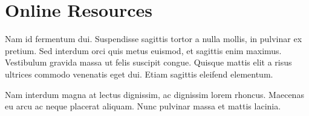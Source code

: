 \documentclass[sigconf]{acmart}
\begin{document}
\section{Online Resources}

Nam id fermentum dui. Suspendisse sagittis tortor a nulla mollis, in pulvinar ex pretium. Sed interdum orci quis metus euismod, et sagittis enim maximus. Vestibulum gravida massa ut felis suscipit congue. Quisque mattis elit a risus ultrices commodo venenatis eget dui. Etiam sagittis eleifend elementum. 

Nam interdum magna at lectus dignissim, ac dignissim lorem rhoncus. Maecenas eu arcu ac neque placerat aliquam. Nunc pulvinar massa et mattis lacinia.
\end{document}
